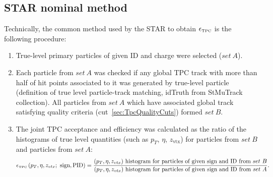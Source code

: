 \subsection{STAR nominal method}
Technically, the common method used by the STAR to obtain  $\epsilon_{\textrm{\tiny TPC}}$ is the following procedure:
\begin{enumerate}
	\item True-level primary particles of given ID and charge were selected ($set~A$).
	\item Each particle from $set~A$ was checked if any global TPC track with more than half of hit points associated to it was generated by true-level particle  (definition of true level particle-track matching, idTruth from StMuTrack collection). All particles from $set~A$ which have associated global track satisfying quality criteria (cut~\ref{sec:TpcQualityCuts}) formed $set~B$.
	\item The joint TPC acceptance and efficiency was calculated as the ratio of the histograms of true level quantities (such as $p_{T}$, $\eta$, $z_{\textrm{vtx}}$) for particles from $set~B$ and particles from $set~A$:
	\begin{equation}\label{eq:tpcAccAndEffDefinition}
	\epsilon_{\textrm{\tiny TPC}}\left(p_{T}, \eta, z_{vtx};~\textrm{sign},\textrm{PID}\right) = \frac{(p_{T},\eta, z_{vtx})~\textrm{histogram for particles of given sign and ID from}~set~B}{(p_{T},\eta, z_{vtx})~\textrm{histogram for particles of given sign and ID from}~set~A}.
	\end{equation}
	
\end{enumerate}
